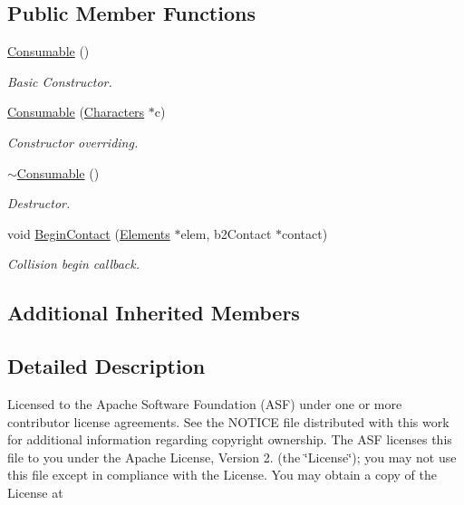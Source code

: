 \subsection*{Public Member Functions}
\begin{DoxyCompactItemize}
\item 
\hyperlink{class_consumable_ae374944f6333618dd08318b98b6950c7}{Consumable} ()
\begin{DoxyCompactList}\small\item\em Basic Constructor. \end{DoxyCompactList}\item 
\hyperlink{class_consumable_adeca9f0d06a24fb2b76ddaa1396d1ddc}{Consumable} (\hyperlink{class_characters}{Characters} $\ast$c)
\begin{DoxyCompactList}\small\item\em Constructor overriding. \end{DoxyCompactList}\item 
\hypertarget{class_consumable_aed7671d58f80f5244e5851f591e4b8a2}{\hyperlink{class_consumable_aed7671d58f80f5244e5851f591e4b8a2}{$\sim$\-Consumable} ()}\label{class_consumable_aed7671d58f80f5244e5851f591e4b8a2}

\begin{DoxyCompactList}\small\item\em Destructor. \end{DoxyCompactList}\item 
void \hyperlink{class_consumable_adb866e69c3796edffad832b88e527518}{Begin\-Contact} (\hyperlink{class_elements}{Elements} $\ast$elem, b2\-Contact $\ast$contact)
\begin{DoxyCompactList}\small\item\em Collision begin callback. \end{DoxyCompactList}\end{DoxyCompactItemize}
\subsection*{Additional Inherited Members}


\subsection{Detailed Description}
Licensed to the Apache Software Foundation (A\-S\-F) under one or more contributor license agreements. See the N\-O\-T\-I\-C\-E file distributed with this work for additional information regarding copyright ownership. The A\-S\-F licenses this file to you under the Apache License, Version 2. (the \char`\"{}\-License\char`\"{}); you may not use this file except in compliance with the License. You may obtain a copy of the License at

